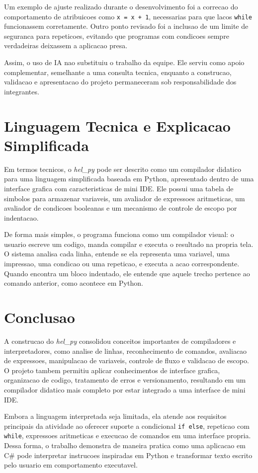 \documentclass[12pt,a4paper]{article}
\begin{document}
Um exemplo de ajuste realizado durante o desenvolvimento foi a correcao do comportamento de atribuicoes como \texttt{x = x + 1}, necessarias para que lacos \texttt{while} funcionassem corretamente. Outro ponto revisado foi a inclusao de um limite de seguranca para repeticoes, evitando que programas com condicoes sempre verdadeiras deixassem a aplicacao presa.

Assim, o uso de IA nao substituiu o trabalho da equipe. Ele serviu como apoio complementar, semelhante a uma consulta tecnica, enquanto a construcao, validacao e apresentacao do projeto permaneceram sob responsabilidade dos integrantes.

\section{Linguagem Tecnica e Explicacao Simplificada}

Em termos tecnicos, o \textit{hel\_py} pode ser descrito como um compilador didatico para uma linguagem simplificada baseada em Python, apresentado dentro de uma interface grafica com caracteristicas de mini IDE. Ele possui uma tabela de simbolos para armazenar variaveis, um avaliador de expressoes aritmeticas, um avaliador de condicoes booleanas e um mecanismo de controle de escopo por indentacao.

De forma mais simples, o programa funciona como um compilador visual: o usuario escreve um codigo, manda compilar e executa o resultado na propria tela. O sistema analisa cada linha, entende se ela representa uma variavel, uma impressao, uma condicao ou uma repeticao, e executa a acao correspondente. Quando encontra um bloco indentado, ele entende que aquele trecho pertence ao comando anterior, como acontece em Python.

\section{Conclusao}

A construcao do \textit{hel\_py} consolidou conceitos importantes de compiladores e interpretadores, como analise de linhas, reconhecimento de comandos, avaliacao de expressoes, manipulacao de variaveis, controle de fluxo e validacao de escopo. O projeto tambem permitiu aplicar conhecimentos de interface grafica, organizacao de codigo, tratamento de erros e versionamento, resultando em um compilador didatico mais completo por estar integrado a uma interface de mini IDE.

Embora a linguagem interpretada seja limitada, ela atende aos requisitos principais da atividade ao oferecer suporte a condicional \texttt{if else}, repeticao com \texttt{while}, expressoes aritmeticas e execucao de comandos em uma interface propria. Dessa forma, o trabalho demonstra de maneira pratica como uma aplicacao em C\# pode interpretar instrucoes inspiradas em Python e transformar texto escrito pelo usuario em comportamento executavel.
\end{document}
